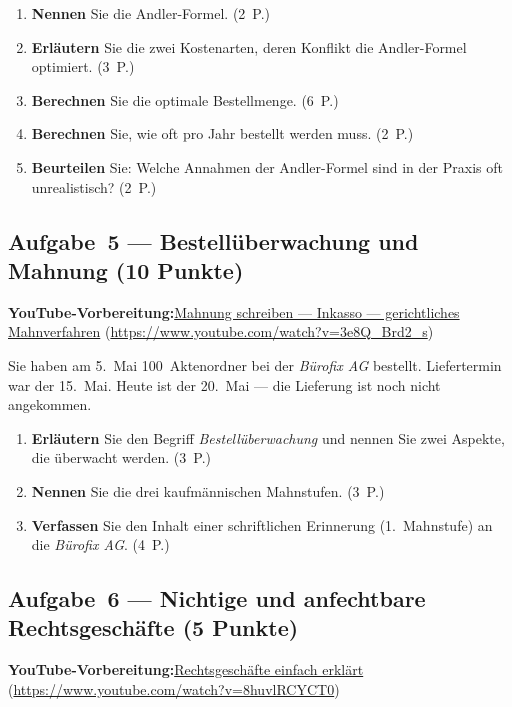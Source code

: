 \documentclass[11pt, a4paper]{article}
\begin{document}
\begin{enumerate}[label=(\alph*)]
  \item \textbf{Nennen} Sie die Andler-Formel. \hfill (2~P.)
  \item \textbf{Erläutern} Sie die zwei Kostenarten, deren Konflikt die Andler-Formel optimiert. \hfill (3~P.)
  \item \textbf{Berechnen} Sie die optimale Bestellmenge. \hfill (6~P.)
  \item \textbf{Berechnen} Sie, wie oft pro Jahr bestellt werden muss. \hfill (2~P.)
  \item \textbf{Beurteilen} Sie: Welche Annahmen der Andler-Formel sind in der Praxis oft unrealistisch? \hfill (2~P.)
\end{enumerate}

\subsection*{Aufgabe~5 --- Bestellüberwachung und Mahnung (10 Punkte)}

\noindent\textbf{\color{bfwAccent}YouTube-Vorbereitung:}\enspace \href{https://www.youtube.com/watch?v=3e8Q_Brd2_s}{Mahnung schreiben --- Inkasso --- gerichtliches Mahnverfahren} (\url{https://www.youtube.com/watch?v=3e8Q_Brd2_s})

\medskip
Sie haben am 5.~Mai 100~Aktenordner bei der \emph{Bürofix AG} bestellt. Liefertermin
war der 15.~Mai. Heute ist der 20.~Mai --- die Lieferung ist noch nicht angekommen.

\begin{enumerate}[label=(\alph*)]
  \item \textbf{Erläutern} Sie den Begriff \emph{Bestellüberwachung} und nennen Sie zwei Aspekte, die überwacht werden. \hfill (3~P.)
  \item \textbf{Nennen} Sie die drei kaufmännischen Mahnstufen. \hfill (3~P.)
  \item \textbf{Verfassen} Sie den Inhalt einer schriftlichen Erinnerung (1.~Mahnstufe) an die \emph{Bürofix AG}. \hfill (4~P.)
\end{enumerate}

\subsection*{Aufgabe~6 --- Nichtige und anfechtbare Rechtsgeschäfte (5 Punkte)}

\noindent\textbf{\color{bfwAccent}YouTube-Vorbereitung:}\enspace \href{https://www.youtube.com/watch?v=8huvlRCYCT0}{Rechtsgeschäfte einfach erklärt} (\url{https://www.youtube.com/watch?v=8huvlRCYCT0})
\end{document}

